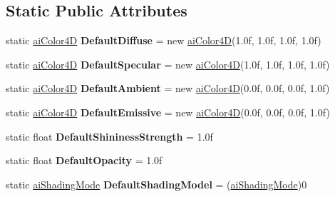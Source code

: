 \subsection*{Static Public Attributes}
\begin{DoxyCompactItemize}
\item 
\hypertarget{classai_material_ac7c226e3125c12da52b5f36f348ad798}{static \hyperlink{structai_color4_d}{ai\+Color4\+D} {\bfseries Default\+Diffuse} = new \hyperlink{structai_color4_d}{ai\+Color4\+D}(1.\+0f, 1.\+0f, 1.\+0f, 1.\+0f)}\label{classai_material_ac7c226e3125c12da52b5f36f348ad798}

\item 
\hypertarget{classai_material_aeb604078ec8f4ae44be463055d4e9c6c}{static \hyperlink{structai_color4_d}{ai\+Color4\+D} {\bfseries Default\+Specular} = new \hyperlink{structai_color4_d}{ai\+Color4\+D}(1.\+0f, 1.\+0f, 1.\+0f, 1.\+0f)}\label{classai_material_aeb604078ec8f4ae44be463055d4e9c6c}

\item 
\hypertarget{classai_material_adc290d5bd9d13f40dd5d2c4a4c9b8259}{static \hyperlink{structai_color4_d}{ai\+Color4\+D} {\bfseries Default\+Ambient} = new \hyperlink{structai_color4_d}{ai\+Color4\+D}(0.\+0f, 0.\+0f, 0.\+0f, 1.\+0f)}\label{classai_material_adc290d5bd9d13f40dd5d2c4a4c9b8259}

\item 
\hypertarget{classai_material_a516cc0218633307aec4e1b755dfbd743}{static \hyperlink{structai_color4_d}{ai\+Color4\+D} {\bfseries Default\+Emissive} = new \hyperlink{structai_color4_d}{ai\+Color4\+D}(0.\+0f, 0.\+0f, 0.\+0f, 1.\+0f)}\label{classai_material_a516cc0218633307aec4e1b755dfbd743}

\item 
\hypertarget{classai_material_aa90f5a9fd9b4a6a0e347e0fbc1570fd0}{static float {\bfseries Default\+Shininess\+Strength} = 1.\+0f}\label{classai_material_aa90f5a9fd9b4a6a0e347e0fbc1570fd0}

\item 
\hypertarget{classai_material_a32473a4d98684d4e61798960e00549f9}{static float {\bfseries Default\+Opacity} = 1.\+0f}\label{classai_material_a32473a4d98684d4e61798960e00549f9}

\item 
\hypertarget{classai_material_a202357bad84eb84fddd47da33a4bb17a}{static \hyperlink{material_8h_a93e23e0201d6ed86fb4287e15218e4cf}{ai\+Shading\+Mode} {\bfseries Default\+Shading\+Model} = (\hyperlink{material_8h_a93e23e0201d6ed86fb4287e15218e4cf}{ai\+Shading\+Mode})0}\label{classai_material_a202357bad84eb84fddd47da33a4bb17a}


\end{DoxyCompactItemize}
